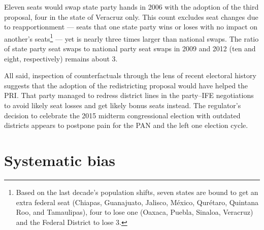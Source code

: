 \documentclass[letter,12pt]{article}
\begin{document}
Eleven seats would swap state party hands in 2006 with the adoption of the third proposal, four in the state of Veracruz only. This count excludes seat changes due to reapportionment --- seats that one state party wins or loses with no impact on another's seats\footnote{Based on the last decade's population shifts, seven states are bound to get an extra federal seat (Chiapas, Guanajuato, Jalisco, M\'exico, Qur\'etaro, Quintana Roo, and Tamaulipas), four to lose one (Oaxaca, Puebla, Sinaloa, Veracruz) and the Federal District to lose 3.} --- yet is nearly three times larger than national swaps. The ratio of state party seat swaps to national party seat swaps in 2009 and 2012 (ten and eight, respectively) remains about 3. 



All said, inspection of counterfactuals through the lens of recent electoral history suggests that the adoption of the redistricting proposal would have helped the PRI. That party managed to redress district lines in the party--IFE negotiations to avoid likely seat losses and get likely bonus seats instead. The regulator's decision to celebrate the 2015 midterm congressional election with outdated districts appears to postpone pain for the PAN and the left one election cycle. 

\section{Systematic bias}
\end{document}
